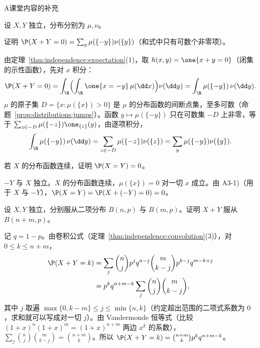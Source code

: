 \begin{exercises}{A}{课堂内容的补充}
\item\label{ex:independence:A3} 设 $X,Y$ 独立，分布分别为 $\mu,\nu$。
\begin{questions}
\item 证明 $\P(X+Y=0)=\sum_y\mu(\{-y\})\nu(\{y\})$（和式中只有可数个非零项）。
\begin{solution}
由定理~\ref{thm:independence:expectation}(1)，取 $h(x,y)=\one\{x+y=0\}$（闭集的示性函数），先对 $x$ 积分：
\[
\P(X+Y=0)=\int_\R\Bigl(\int_\R\one\{x=-y\}\,\mu(\dd x)\Bigr)\nu(\dd y)=\int_\R\mu(\{-y\})\,\nu(\dd y).
\]
$\mu$ 的原子集 $D=\{x:\mu(\{x\})>0\}$ 是 $\mu$ 的分布函数的间断点集，至多可数（命题~\ref{prop:distributions:jumps}）。函数 $y\mapsto\mu(\{-y\})$ 只在可数集 $-D$ 上非零，等于 $\sum_{z\in-D}\mu(\{-z\})\one_{\{z\}}(y)$，由逐项积分，
\[
\int_\R\mu(\{-y\})\,\nu(\dd y)=\sum_{z\in-D}\mu(\{-z\})\nu(\{z\})=\sum_y\mu(\{-y\})\nu(\{y\}).
\]
\end{solution}
\item 若 $X$ 的分布函数连续，证明 $\P(X=Y)=0$。
\begin{solution}
$-Y$ 与 $X$ 独立。$X$ 的分布函数连续，$\mu(\{x\})=0$ 对一切 $x$ 成立。由 A3-1)（用于 $X$ 与 $-Y$），$\P(X=Y)=\P(X+(-Y)=0)=0$。
\end{solution}
\end{questions}

\item\label{ex:independence:A4} 设 $X,Y$ 独立，分别服从二项分布 $B(n,p)$ 与 $B(m,p)$。证明 $X+Y$ 服从 $B(n+m,p)$。
\begin{solution}
记 $q=1-p$。由卷积公式（定理~\ref{thm:independence:convolution}(3)），对 $0\leqslant k\leqslant n+m$，
\[
\begin{aligned}
\P(X+Y=k)&=\sum_j\binom njp^jq^{n-j}\binom m{k-j}p^{k-j}q^{m-k+j}\\
&=p^kq^{n+m-k}\sum_j\binom nj\binom m{k-j},
\end{aligned}
\]
其中 $j$ 取遍 $\max\{0,k-m\}\leqslant j\leqslant\min\{n,k\}$（约定超出范围的二项式系数为 $0$，求和就可以写成对一切 $j$）。由 Vandermonde 恒等式（比较 $(1+x)^n(1+x)^m=(1+x)^{n+m}$ 两边 $x^k$ 的系数），$\sum_j\binom nj\binom m{k-j}=\binom{n+m}k$。所以 $\P(X+Y=k)=\binom{n+m}kp^kq^{n+m-k}$。
\end{solution}


\end{exercises}
